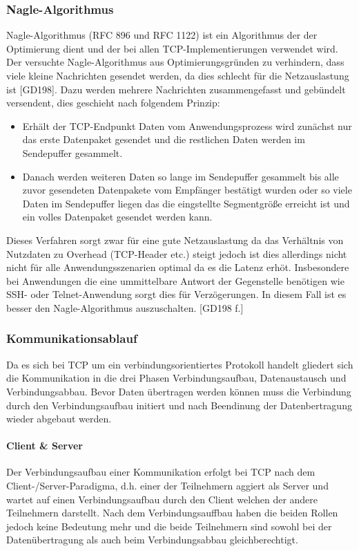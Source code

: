 \subsubsection{Nagle-Algorithmus}
Nagle-Algorithmus (RFC 896 und RFC 1122) ist ein Algorithmus der der Optimierung dient und der bei allen 
TCP-Implementierungen verwendet wird. Der versuchte Nagle-Algorithmus aus Optimierungsgründen zu verhindern, dass viele kleine Nachrichten gesendet werden, da dies schlecht für die Netzauslastung ist [GD198]. \newline
Dazu werden mehrere Nachrichten zusammengefasst und gebündelt versendent, dies geschieht nach folgendem Prinzip:
\begin{itemize}
	\item{Erhält der TCP-Endpunkt Daten vom Anwendungsprozess wird zunächst nur das erste Datenpaket gesendet und die restlichen Daten werden im Sendepuffer gesammelt.}
	\item{Danach werden weiteren Daten so lange im Sendepuffer gesammelt bis alle zuvor gesendeten Datenpakete vom Empfänger bestätigt wurden oder so viele Daten im Sendepuffer liegen das die eingstellte Segmentgröße erreicht ist und ein volles Datenpaket gesendet werden kann.}
\end{itemize}
Dieses Verfahren sorgt zwar für eine gute Netzauslastung da das Verhältnis von Nutzdaten zu Overhead (TCP-Header etc.) steigt jedoch ist dies allerdings nicht nicht für alle Anwendungsszenarien optimal da es die Latenz erhöt. Insbesondere bei Anwendungen die eine ummittelbare Antwort der Gegenstelle benötigen wie SSH- oder Telnet-Anwendung sorgt dies für Verzögerungen. In diesem Fall ist es besser den Nagle-Algorithmus auszuschalten. [GD198 f.]
\subsubsection{Kommunikationsablauf}
Da es sich bei TCP um ein verbindungsorientiertes Protokoll handelt gliedert sich die Kommunikation in die drei Phasen Verbindungsaufbau, Datenaustausch und Verbindungsabbau. Bevor Daten übertragen werden können muss die Verbindung durch den Verbindungsaufbau initiert und nach Beendinung der Datenbertragung
wieder abgebaut werden. 
\paragraph{Client \& Server}
Der Verbindungsaufbau einer Kommunikation erfolgt bei TCP nach dem Client-/Server-Paradigma, d.h. einer der Teilnehmern aggiert als Server und wartet auf einen Verbindungsaufbau durch den Client welchen der andere Teilnehmern darstellt. \newline
Nach dem Verbindungsauffbau haben die beiden Rollen jedoch keine Bedeutung mehr und die beide Teilnehmern
sind sowohl bei der Datenübertragung als auch beim Verbindungsabbau gleichberechtigt.
